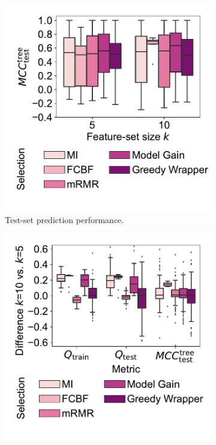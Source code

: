 \documentclass{article}
\theoremstyle{definition}
\begin{document}
\begin{figure}[t]
	\centering
	\begin{subfigure}[t]{0.48\textwidth}
		\centering
		\includegraphics[width=\textwidth, trim=15 35 5 15, clip]{plots/afs-impact-fs-method-k-decision-tree-test-mcc.pdf}
		\caption{Test-set prediction performance.}
		\label{fig:afs:impact-fs-method-k-decision-tree-test-mcc}
	\end{subfigure}
	\hfill
	\begin{subfigure}[t]{0.48\textwidth}
		\centering
		\includegraphics[width=\textwidth, trim=15 35 5 15, clip]{plots/afs-impact-fs-method-k-metric-diff.pdf}

\end{subfigure}
\end{figure}
\end{document}
